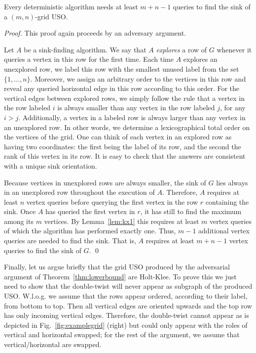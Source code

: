 \documentclass[runningheads,a4paper]{llncs}
\begin{document}
\begin{theorem} \label{thm:lowerbound}
Every deterministic algorithm needs at least $m+n-1$ queries to find the sink of a $(m,n)$-grid USO. 
\end{theorem}
\begin{proof}
    This proof again proceeds by an adversary argument.

Let $A$ be a sink-finding algorithm. We say that $A$ \emph{explores} a row of $G$ whenever it queries a vertex in this row for the first time.
Each time $A$ explores an unexplored row, we label this row with the smallest unused label from the set $\{1, \ldots, n\}$. Moreover, we assign an arbitrary order to the vertices in this row and reveal any queried horizontal edge in this row according to this order. For the vertical edges between explored rows, we simply follow the rule that a vertex in the row labeled $i$ is always smaller than any vertex in the row labeled $j$, for any $i > j$. Additionally, a vertex in a labeled row is always larger than any vertex in an unexplored row. In other words, we determine a lexicographical total order on the vertices of the grid. One can think of each vertex in an explored row as having two coordinates: the first being the label of its row, and the second the rank of this vertex in its row.
It is easy to check that the answers are consistent with a unique sink orientation.

Because vertices in unexplored rows are always smaller, the sink of $G$ lies always in an unexplored row throughout the execution of $A$. Therefore, $A$ requires at least $n$ vertex queries before querying the first vertex in the row $r$ containing the sink. Once $A$ has queried the first vertex in $r$, it has still to find the maximum among its $m$ vertices. 
By Lemma~\ref{lem:kx1} this requires at least $m$ vertex queries of which the algorithm has performed exactly one. Thus, $m-1$ additional vertex queries are needed to find the sink. That is, $A$ requires at least $m+n-1$ vertex queries to find the sink of $G$. \qed
\end{proof}

Finally, let us argue briefly that the grid USO produced by the adversarial argument of Theorem~\ref{thm:lowerbound} are Holt-Klee. 
To prove this we just need to show that the double-twist will never appear as subgraph of the produced USO.
W.l.o.g. we assume that the rows appear ordered, according to their label, from bottom to top. Then all vertical edges are oriented upwards and 
the top row has only incoming vertical edges.
Therefore, the double-twist cannot appear as is depicted in Fig.~\ref{fig:examplegrid} (right) but could only appear with 
the roles of vertical and horizontal swapped; for the rest of the argument, we assume that vertical/horizontal are swapped.
\end{document}
